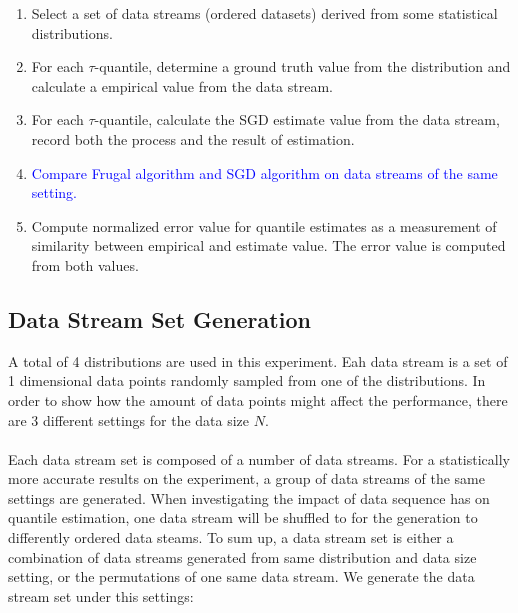 \documentclass[12pt]{article}
\begin{document}
\begin{enumerate}
    \item Select a set of data streams (ordered datasets) derived from some statistical distributions.
    \item For each $\tau$-quantile, determine a ground truth value from the distribution and calculate a empirical value from the data stream.
    \item For each $\tau$-quantile, calculate the SGD estimate value from the data stream, record both the process and the result of estimation.
    \item \textcolor{blue}{
        Compare Frugal algorithm and SGD algorithm on data streams of the same setting.
    }
    \item Compute normalized error value for quantile estimates as a measurement of similarity between empirical and estimate value. The error value is computed from both values.
\end{enumerate}

\subsection{Data Stream Set Generation}
A total of 4 distributions are used in this experiment.
Eah data stream is a set of 1 dimensional data points randomly sampled from one of the distributions. In order to show how the amount of data points might affect the performance, there are 3 different settings for the data size $N$. 
\\\\
Each data stream set is composed of a number of data streams. For a statistically more accurate results on the experiment, a group of data streams of the same settings are generated. When investigating the impact of data sequence has on quantile estimation, one data stream will be shuffled to for the generation to differently ordered data steams. To sum up, a data stream set is either a combination of data streams generated from same distribution and data size setting, or the permutations of one same data stream. We generate the data stream set under this settings:
\end{document}
